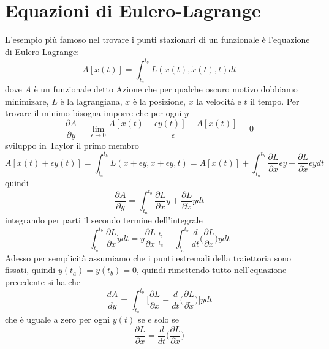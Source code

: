 \documentclass[11pt,a4paper]{report}
\theoremstyle{definition}
\theoremstyle{plain}
\theoremstyle{plain}
\begin{document}
		\section{Equazioni di Eulero-Lagrange}
			L'esempio più famoso nel trovare i punti stazionari di un funzionale è l'equazione di Eulero-Lagrange:
			\begin{equation}
				A[x(t)]=\int_{t_a}^{t_b}L(x(t),\dot{x}(t),t)dt
			\end{equation}
			dove $A$ è un funzionale detto Azione che per qualche oscuro motivo dobbiamo minimizare, $L$ è la lagrangiana, $x$ è la posizione, $\dot{x}$ la velocità e $t$ il tempo.
			Per trovare il minimo bisogna imporre che per ogni $y$
			\[
				\frac{\partial A}{\partial y}=\lim_{\epsilon \to 0}\frac{A[x(t)+\epsilon y(t)]-A[x(t)]}{\epsilon}=0
			\]
			sviluppo in Taylor il primo membro
			\[
				A[x(t)+\epsilon y(t)]=\int_{t_a}^{t_b}L(x+\epsilon y,\dot{x}+\epsilon \dot{y},t)=A[x(t)]+\int_{t_a}^{t_b}\frac{\partial{L}}{\partial{x}}\epsilon y+\frac{\partial{L}}{\partial{\dot{x}}}\epsilon \dot{y}dt
			\]
			quindi
			\[
				\frac{\partial A}{\partial y}=\int_{t_a}^{t_b}\frac{\partial{L}}{\partial{x}}y+\frac{\partial{L}}{\partial{\dot{x}}}\dot{y}dt
			\]
			integrando per parti il secondo termine dell'integrale
			\[
				\int_{t_a}^{t_b}\frac{\partial{L}}{\partial{\dot{x}}}\dot{y}dt=y\frac{\partial{L}}{\partial{\dot{x}}}\bigg\rvert_{t_a}^{t_b}-
				\int_{t_a}^{t_b}\frac{d}{dt}\bigg(\frac{\partial{L}}{\partial{\dot{x}}} \bigg)ydt
			\]
			Adesso per semplicità assumiamo che i punti estremali della traiettoria sono fissati, quindi $y(t_a)=y(t_b)=0$, quindi rimettendo tutto nell'equazione precedente si ha che
			\begin{equation}
				\frac{dA}{dy}=\int_{t_a}^{t_b}\bigg[\frac{\partial{L}}{\partial{x}}-\frac{d}{dt}\bigg(\frac{\partial{L}}{\partial{\dot{x}}} \bigg)\bigg]ydt
			\end{equation}
			che è uguale a zero per ogni $y(t)$ se e solo se 
			\begin{equation}
				\frac{\partial{L}}{\partial{x}}=\frac{d}{dt}\bigg(\frac{\partial{L}}{\partial{\dot{x}}} \bigg)
			\end{equation}
\end{document}
